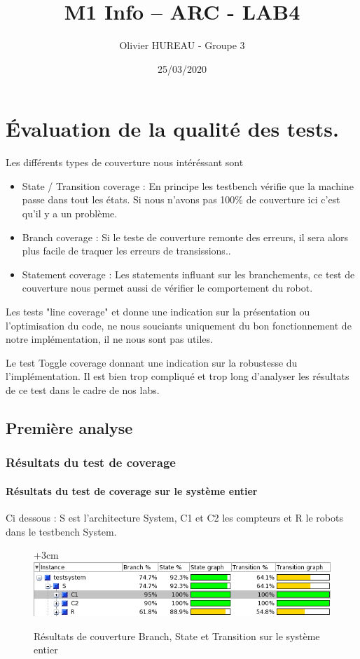 \documentclass{article}
\title{M1 Info – ARC - LAB4}
\author{Olivier HUREAU - Groupe 3}
\date{25/03/2020}
\begin{document}
\maketitle
\renewcommand{\contentsname}{Table des matières}
\tableofcontents
\newpage

\section{Évaluation de la qualité des tests.}
Les différents types de couverture nous intéréssant sont 
\begin{itemize}
	\item State / Transition coverage : En principe les testbench vérifie que la machine passe dans tout les états. Si nous n'avons pas 100\% de couverture ici c'est qu'il y a un problème.
		\item Branch coverage : Si le teste de couverture remonte des erreurs, il sera alors plus facile de traquer les erreurs de transissions..
	\item Statement coverage : Les statements influant sur les branchements, ce test de couverture nous permet aussi de vérifier le comportement du robot.

\end{itemize}

Les tests "line coverage" et  donne une indication sur la présentation ou l'optimisation du code, ne nous souciants uniquement du bon fonctionnement de notre implémentation, il ne nous sont pas utiles.

Le test Toggle coverage donnant une indication sur la robustesse du l'implémentation. Il est bien trop compliqué et trop long d'analyser les résultats de ce test dans le cadre de nos labs.


\subsection{Première analyse}

\subsubsection{Résultats du test de coverage}

\paragraph{Résultats du test de coverage sur le système entier}

Ci dessous : S est l'architecture System, C1 et C2 les compteurs et R le robots dans le testbench System.
\begin{figure}[!h]
\advance\leftskip+3cm
\includegraphics[scale=0.70]{PremiereAnalyse/Coverage.PNG}
\caption{Résultats de couverture Branch, State et Transition sur le système entier}
\end{figure}
\end{document}
